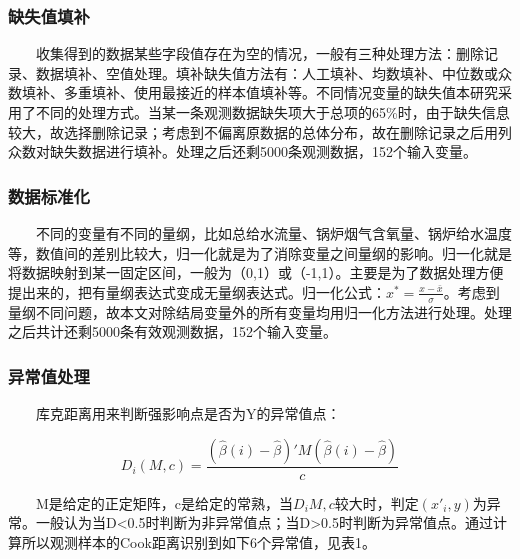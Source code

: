 \documentclass[
]{article}
\begin{document}
\hypertarget{ux7f3aux5931ux503cux586bux8865}{%
\subsubsection{缺失值填补}\label{ux7f3aux5931ux503cux586bux8865}}

  收集得到的数据某些字段值存在为空的情况，一般有三种处理方法：删除记录、数据填补、空值处理。填补缺失值方法有：人工填补、均数填补、中位数或众数填补、多重填补、使用最接近的样本值填补等。不同情况变量的缺失值本研究采用了不同的处理方式。当某一条观测数据缺失项大于总项的65\%时，由于缺失信息较大，故选择删除记录；考虑到不偏离原数据的总体分布，故在删除记录之后用列众数对缺失数据进行填补。处理之后还剩5000条观测数据，152个输入变量。

\hypertarget{ux6570ux636eux6807ux51c6ux5316}{%
\subsubsection{数据标准化}\label{ux6570ux636eux6807ux51c6ux5316}}

  不同的变量有不同的量纲，比如总给水流量、锅炉烟气含氧量、锅炉给水温度等，数值间的差别比较大，归一化就是为了消除变量之间量纲的影响。归一化就是将数据映射到某一固定区间，一般为（0,1）或（-1,1）。主要是为了数据处理方便提出来的，把有量纲表达式变成无量纲表达式。归一化公式：\(x^*=\frac{x-\bar{x}}{\sigma}\)。考虑到量纲不同问题，故本文对除结局变量外的所有变量均用归一化方法进行处理。处理之后共计还剩5000条有效观测数据，152个输入变量。

\hypertarget{ux5f02ux5e38ux503cux5904ux7406}{%
\subsubsection{异常值处理}\label{ux5f02ux5e38ux503cux5904ux7406}}

  库克距离用来判断强影响点是否为Y的异常值点：

\[D_i(M,c)=\frac{\left(\hat{\beta}(i)-\hat{\beta}\right)'M\left(\hat{\beta}(i)-\hat{\beta}\right)}{c}\]

  M是给定的正定矩阵，c是给定的常熟，当\(D_i{M,c}\)较大时，判定\((x'_i,y)\)为异常。一般认为当D\textless0.5时判断为非异常值点；当D\textgreater0.5时判断为异常值点。通过计算所以观测样本的Cook距离识别到如下6个异常值，见表1。
\end{document}
